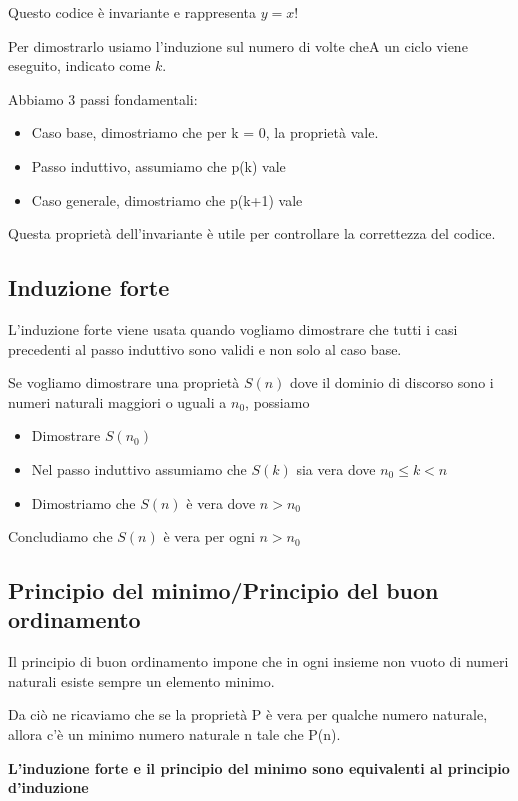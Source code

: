 \documentclass[a4paper]{article}
\begin{document}
Questo codice è invariante e rappresenta $y=x!$

Per dimostrarlo usiamo l'induzione sul numero di volte cheA un ciclo viene eseguito, indicato come $k$.

Abbiamo 3 passi fondamentali:

\begin{itemize}
	\item Caso base, dimostriamo che per k = 0, la proprietà vale. 
	\item Passo induttivo, assumiamo che p(k) vale
	\item Caso generale, dimostriamo che p(k+1) vale 
\end{itemize}

Questa proprietà dell'invariante è utile per controllare la correttezza del codice.

\subsection{Induzione forte}

L'induzione forte viene usata quando vogliamo dimostrare che tutti i casi precedenti al passo induttivo sono validi e non solo al caso base.

Se vogliamo dimostrare una proprietà $S(n)$ dove il dominio di discorso sono i numeri naturali maggiori o uguali a $n_0$, possiamo

\begin{itemize}
	\item Dimostrare $S(n_0)$
	\item Nel passo induttivo assumiamo che $S(k)$ sia vera dove $n_0 \leq k < n$
	\item Dimostriamo che $S(n)$ è vera dove $n > n_0$
\end{itemize}

Concludiamo che $S(n)$ è vera per ogni $n > n_0$

\subsection{Principio del minimo/Principio del buon ordinamento}

Il principio di buon ordinamento impone che in ogni insieme non vuoto di numeri naturali esiste sempre un elemento minimo.

Da ciò ne ricaviamo che se la proprietà P è vera per qualche numero naturale, allora c’è un minimo numero naturale n tale che P(n).

\textbf{L'induzione forte e il principio del minimo sono equivalenti al principio d'induzione}
\end{document}
